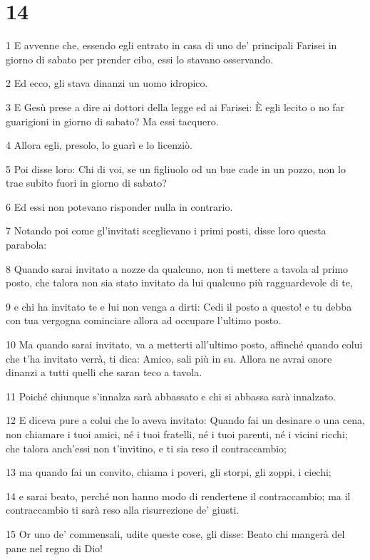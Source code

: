 \chapter{14}

\par 1 E avvenne che, essendo egli entrato in casa di uno de' principali Farisei in giorno di sabato per prender cibo, essi lo stavano osservando.
\par 2 Ed ecco, gli stava dinanzi un uomo idropico.
\par 3 E Gesù prese a dire ai dottori della legge ed ai Farisei: È egli lecito o no far guarigioni in giorno di sabato? Ma essi tacquero.
\par 4 Allora egli, presolo, lo guarì e lo licenziò.
\par 5 Poi disse loro: Chi di voi, se un figliuolo od un bue cade in un pozzo, non lo trae subito fuori in giorno di sabato?
\par 6 Ed essi non potevano risponder nulla in contrario.
\par 7 Notando poi come gl'invitati sceglievano i primi posti, disse loro questa parabola:
\par 8 Quando sarai invitato a nozze da qualcuno, non ti mettere a tavola al primo posto, che talora non sia stato invitato da lui qualcuno più ragguardevole di te,
\par 9 e chi ha invitato te e lui non venga a dirti: Cedi il posto a questo! e tu debba con tua vergogna cominciare allora ad occupare l'ultimo posto.
\par 10 Ma quando sarai invitato, va a metterti all'ultimo posto, affinché quando colui che t'ha invitato verrà, ti dica: Amico, sali più in su. Allora ne avrai onore dinanzi a tutti quelli che saran teco a tavola.
\par 11 Poiché chiunque s'innalza sarà abbassato e chi si abbassa sarà innalzato.
\par 12 E diceva pure a colui che lo aveva invitato: Quando fai un desinare o una cena, non chiamare i tuoi amici, né i tuoi fratelli, né i tuoi parenti, né i vicini ricchi; che talora anch'essi non t'invitino, e ti sia reso il contraccambio;
\par 13 ma quando fai un convito, chiama i poveri, gli storpi, gli zoppi, i ciechi;
\par 14 e sarai beato, perché non hanno modo di rendertene il contraccambio; ma il contraccambio ti sarà reso alla risurrezione de' giusti.
\par 15 Or uno de' commensali, udite queste cose, gli disse: Beato chi mangerà del pane nel regno di Dio!
